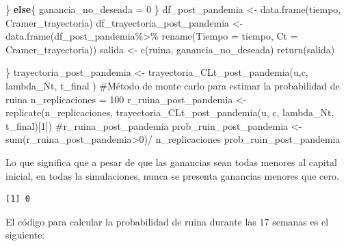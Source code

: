 \documentclass[
  us-letterpaper,
]{scrreprt}
\newenvironment{Shaded}{\begin{snugshade}}{\end{snugshade}}
\newcommand{\AttributeTok}[1]{\textcolor[rgb]{0.40,0.45,0.13}{#1}}
\newcommand{\CommentTok}[1]{\textcolor[rgb]{0.37,0.37,0.37}{#1}}
\newcommand{\ControlFlowTok}[1]{\textcolor[rgb]{0.00,0.23,0.31}{\textbf{#1}}}
\newcommand{\DecValTok}[1]{\textcolor[rgb]{0.68,0.00,0.00}{#1}}
\newcommand{\FunctionTok}[1]{\textcolor[rgb]{0.28,0.35,0.67}{#1}}
\newcommand{\NormalTok}[1]{\textcolor[rgb]{0.00,0.23,0.31}{#1}}
\newcommand{\OtherTok}[1]{\textcolor[rgb]{0.00,0.23,0.31}{#1}}
\newcommand{\SpecialCharTok}[1]{\textcolor[rgb]{0.37,0.37,0.37}{#1}}
\theoremstyle{plain}
\theoremstyle{plain}
\theoremstyle{definition}
\theoremstyle{remark}
\begin{document}
\begin{Shaded}
\begin{Highlighting}[]
\NormalTok{  \} }
  \ControlFlowTok{else}\NormalTok{\{}
\NormalTok{    ganancia\_no\_deseada }\OtherTok{=} \DecValTok{0}
\NormalTok{  \}}
\NormalTok{  df\_post\_pandemia }\OtherTok{\textless{}{-}} \FunctionTok{data.frame}\NormalTok{(tiempo, Cramer\_trayectoria)}
\NormalTok{  df\_trayectoria\_post\_pandemia }\OtherTok{\textless{}{-}} \FunctionTok{data.frame}\NormalTok{(df\_post\_pandemia}\SpecialCharTok{\%\textgreater{}\%} 
                                  \FunctionTok{rename}\NormalTok{(}\AttributeTok{Tiempo =}\NormalTok{ tiempo, }
                                  \AttributeTok{Ct =}\NormalTok{ Cramer\_trayectoria))}
\NormalTok{  salida }\OtherTok{\textless{}{-}} \FunctionTok{c}\NormalTok{(ruina, ganancia\_no\_deseada)}
  \FunctionTok{return}\NormalTok{(salida)}
  
\NormalTok{\}}
\NormalTok{trayectoria\_post\_pandemia }\OtherTok{\textless{}{-}} \FunctionTok{trayectoria\_CLt\_post\_pandemia}\NormalTok{(u,c,}
\NormalTok{                                            lambda\_Nt, t\_final )}
\CommentTok{\#Método de monte carlo para estimar la probabilidad de ruina}
\NormalTok{n\_replicaciones }\OtherTok{=} \DecValTok{100}
\NormalTok{r\_ruina\_post\_pandemia }\OtherTok{\textless{}{-}} \FunctionTok{replicate}\NormalTok{(n\_replicaciones,}
          \FunctionTok{trayectoria\_CLt\_post\_pandemia}\NormalTok{(u, c, lambda\_Nt, t\_final)[}\DecValTok{1}\NormalTok{])}
\CommentTok{\#r\_ruina\_post\_pandemia}
\NormalTok{prob\_ruin\_post\_pandemia }\OtherTok{\textless{}{-}} \FunctionTok{sum}\NormalTok{(r\_ruina\_post\_pandemia}\SpecialCharTok{\textgreater{}}\DecValTok{0}\NormalTok{)}\SpecialCharTok{/}
\NormalTok{n\_replicaciones}
\NormalTok{prob\_ruin\_post\_pandemia}
\end{Highlighting}
\end{Shaded}

Lo que significa que a pesar de que las ganancias sean todas menores al
capital inicial, en todas la simulaciones, nunca se presenta ganancias
menores que cero.

\begin{verbatim}
[1] 0
\end{verbatim}

El código para calcular la probabilidad de ruina durante las \(17\)
semanas es el siguiente:
\end{document}

